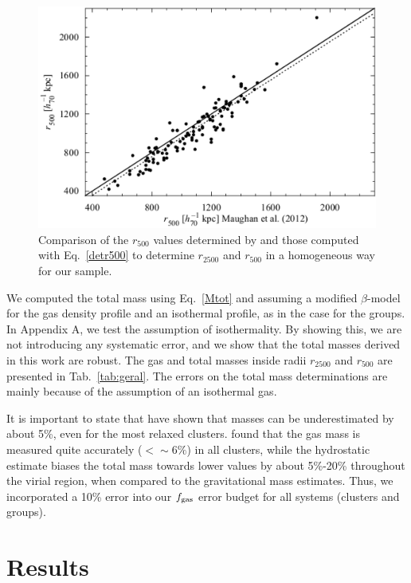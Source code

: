 \documentclass{aa}
\begin{document}
\begin{figure}[h]
\centering
\includegraphics[width=9.cm]{r500_Maughan_hydro_bis.eps}
\caption{Comparison of the $r_{500}$ values determined by \citet{M12}
  and those computed with Eq.~\ref{detr500}  to
  determine $r_{2500}$ and $r_{500}$ in a homogeneous way for our
  sample.}
\label{fig:compr500}
\end{figure}

We computed the total mass using Eq.~\ref{Mtot} and assuming 
a modified $\beta$-model for the gas density profile and 
an
isothermal profile, as in the case for the groups. 
In Appendix A,
we test the assumption of isothermality. By showing this, 
we are not introducing any systematic error, and we show that
the total masses derived in this work are robust.
The gas and
total masses inside radii $r_{2500}$ and $r_{500}$ are presented in
Tab.~\ref{tab:geral}. The errors on the total mass determinations 
are mainly because of the assumption of an isothermal gas. 

It is important to state that \citet{piffaretti08} have shown that masses can be 
underestimated by about 5\%, even for the most relaxed clusters. 
\citet{nagai07} found that the gas mass is measured quite accurately ($< \sim 6\%$) 
in all clusters, while the hydrostatic estimate biases the total mass towards lower values by about 
5\%-20\% throughout the virial region, when compared to the gravitational mass estimates.
Thus, we incorporated a 10\% error into our $f_{\rm gas}$ error budget for all 
systems (clusters and groups).

\section{Results}
\label{res}
\end{document}
